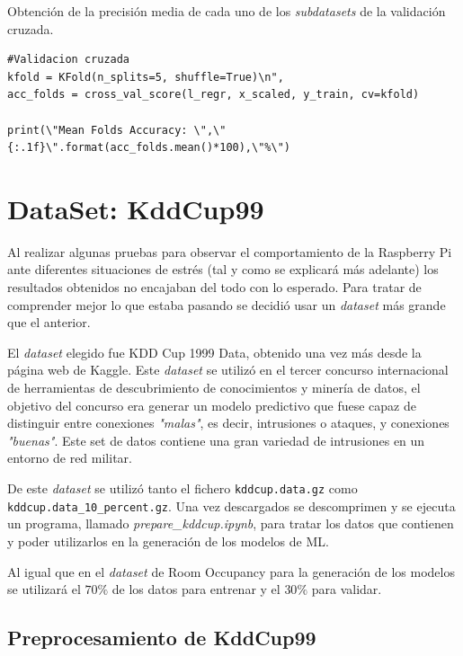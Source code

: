 \documentclass[a4paper, 12pt]{book}
\begin{document}
 \begin{listing}[]
    \caption{Obtención de la precisión media de cada uno de los \textit{subdatasets} de la validación cruzada.}{}
    \label{lst:get_CV}
    \begin{verbatim}
#Validacion cruzada
kfold = KFold(n_splits=5, shuffle=True)\n",
acc_folds = cross_val_score(l_regr, x_scaled, y_train, cv=kfold)

print(\"Mean Folds Accuracy: \",\"{:.1f}\".format(acc_folds.mean()*100),\"%\")
    \end{verbatim}
\end{listing}
 


\section{DataSet: KddCup99}
\label{subsec:dataset_kddcup99}

Al realizar algunas pruebas para observar el comportamiento de la Raspberry Pi ante diferentes situaciones de estrés (tal y como se explicará más adelante) los resultados obtenidos no encajaban del todo con lo esperado. Para tratar de comprender mejor lo que estaba pasando se decidió usar un \textit{dataset} más grande que el anterior.

El \textit{dataset} elegido fue KDD Cup 1999 Data\cite{DataSetKddCup99}, obtenido una vez más desde la página web de Kaggle. Este \textit{dataset} se utilizó en el tercer concurso internacional de herramientas de descubrimiento de conocimientos y minería de datos, el objetivo del concurso era generar un modelo predictivo que fuese capaz de distinguir entre conexiones \textit{"malas"}, es decir, intrusiones o ataques, y conexiones \textit{"buenas"}. Este set de datos contiene una gran variedad de intrusiones en un entorno de red militar. 

De este \textit{dataset} se utilizó tanto el fichero \texttt{kddcup.data.gz} como \\\texttt{kddcup.data\_10\_percent.gz}. Una vez descargados se descomprimen y se ejecuta un programa, llamado \textit{prepare\_kddcup.ipynb}, para tratar los datos que contienen y poder utilizarlos en la generación de los modelos de ML.

Al igual que en el \textit{dataset} de Room Occupancy para la generación de los modelos se utilizará el $70\%$ de los datos para entrenar y el $30\%$ para validar.

\subsection{Preprocesamiento de KddCup99}
\label{subsec:preprocesamiento_kddcup}
\end{document}
